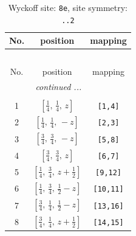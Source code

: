 \documentclass[fleqn,8pt]{jsarticle}
\begin{document}
\begin{longtable}{ccc}
\caption{Wyckoff site: {\tt 8e}, site symmetry: {\tt ..2}}
 \\
 \hline \hline
No. & position & mapping \\ \hline \endfirsthead

\multicolumn{2}{l}{\tablename\ \thetable{}} \\
 \hline \hline
No. & position & mapping \\ \hline \endhead

 \hline \hline
\multicolumn{2}{r}{\footnotesize\it continued ...} \\ \endfoot

 \hline \hline
\multicolumn{2}{r}{} \\ \endlastfoot

1 & $\left[ \frac{1}{4},\, \frac{1}{4},\, z \right]$ & {\tt [1,4]} \\ \hline
2 & $\left[ \frac{1}{4},\, \frac{1}{4},\, - z \right]$ & {\tt [2,3]} \\ \hline
3 & $\left[ \frac{3}{4},\, \frac{3}{4},\, - z \right]$ & {\tt [5,8]} \\ \hline
4 & $\left[ \frac{3}{4},\, \frac{3}{4},\, z \right]$ & {\tt [6,7]} \\ \hline
5 & $\left[ \frac{1}{4},\, \frac{3}{4},\, z + \frac{1}{2} \right]$ & {\tt [9,12]} \\ \hline
6 & $\left[ \frac{1}{4},\, \frac{3}{4},\, \frac{1}{2} - z \right]$ & {\tt [10,11]} \\ \hline
7 & $\left[ \frac{3}{4},\, \frac{1}{4},\, \frac{1}{2} - z \right]$ & {\tt [13,16]} \\ \hline
8 & $\left[ \frac{3}{4},\, \frac{1}{4},\, z + \frac{1}{2} \right]$ & {\tt [14,15]} \\
\end{longtable}
\renewcommand{\arraystretch}{1.2}
\end{document}
